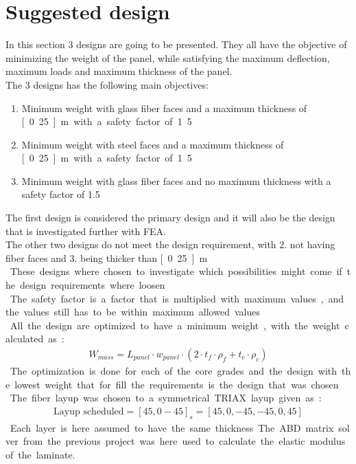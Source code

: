 \documentclass[10pt,a4paper,20pt]{article}
\begin{document}
\section{Suggested design}
In this section 3 designs are going to be presented. They all have the objective of minimizing the weight of the panel, while satisfying the maximum deflection, maximum loads and maximum thickness of the panel. \\
The 3 designs has the following main objectives:
\begin{enumerate}
	\item Minimum weight with glass fiber faces and a maximum thickness of \unit[0.25]{m} with a safety factor of 1.5 
	\item Minimum weight with steel faces and a maximum thickness of \unit[0.25]{m} with a safety factor of 1.5  	
	\item Minimum weight with glass fiber faces and no maximum thickness with a safety factor of 1.5 
\end{enumerate} 
The first design is considered the primary design and it will also be the design that is investigated further with FEA.\\
The other two designs do not meet the design requirement, with 2. not having fiber faces and 3. being thicker than \unit[0.25]{m}. \\
These designs where chosen to investigate which possibilities might come if the design requirements where loosen. \\
The safety factor is a factor that is multiplied with maximum values, and the values still has to be within maximum allowed values.\\
All the design are optimized to have a minimum weight, with the weight calculated as:
\begin{align}
W_{mass} = L_{panel} \cdot w_{panel}\cdot \left(2 \cdot t_f \cdot \rho_f+t_c \cdot \rho_c\right) 
\end{align}
The optimization is done for each of the core grades and the design with the lowest weight that for fill the requirements is the design that was chosen.\\
The fiber layup was chosen to a symmetrical TRIAX layup given as:
\begin{align}
\text{Layup scheduled} = \left[45,0-45\right]_s = \left[45,0,-45,-45,0,45\right]
\end{align} 
Each layer is here assumed to have the same thickness. The ABD matrix solver from the previous project was here used to calculate the elastic modulus of the laminate. 
\end{document}
